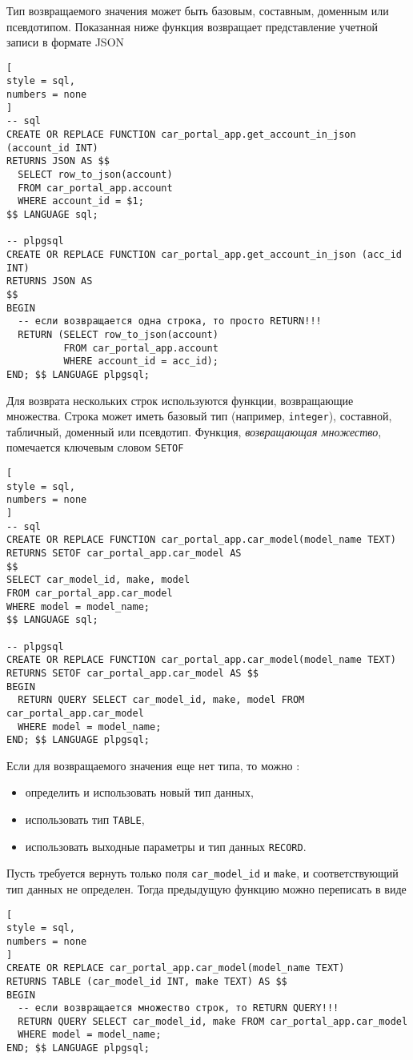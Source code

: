 \documentclass[%
	11pt,
	a4paper,
	utf8,
		]{article}
\begin{document}
Тип возвращаемого значения может быть базовым, составным, доменным или псевдотипом. Показанная ниже функция возвращает представление учетной записи в формате JSON
\begin{lstlisting}[
style = sql,
numbers = none
] 
-- sql
CREATE OR REPLACE FUNCTION car_portal_app.get_account_in_json (account_id INT)
RETURNS JSON AS $$
  SELECT row_to_json(account)
  FROM car_portal_app.account
  WHERE account_id = $1;
$$ LANGUAGE sql;

-- plpgsql
CREATE OR REPLACE FUNCTION car_portal_app.get_account_in_json (acc_id INT)
RETURNS JSON AS 
$$
BEGIN
  -- если возвращается одна строка, то просто RETURN!!!
  RETURN (SELECT row_to_json(account)
          FROM car_portal_app.account
          WHERE account_id = acc_id);
END; $$ LANGUAGE plpgsql;
\end{lstlisting}

Для возврата нескольких строк используются функции, возвращающие множества. Строка может иметь базовый тип (например, \texttt{integer}), составной, табличный, доменный или псевдотип. Функция, \emph{возвращающая множество}, помечается ключевым словом \texttt{SETOF}
\begin{lstlisting}[
style = sql,
numbers = none
]
-- sql
CREATE OR REPLACE FUNCTION car_portal_app.car_model(model_name TEXT)
RETURNS SETOF car_portal_app.car_model AS
$$
SELECT car_model_id, make, model
FROM car_portal_app.car_model
WHERE model = model_name;
$$ LANGUAGE sql;

-- plpgsql
CREATE OR REPLACE FUNCTION car_portal_app.car_model(model_name TEXT)
RETURNS SETOF car_portal_app.car_model AS $$
BEGIN
  RETURN QUERY SELECT car_model_id, make, model FROM car_portal_app.car_model
  WHERE model = model_name;
END; $$ LANGUAGE plpgsql;
\end{lstlisting}

Если для возвращаемого значения еще нет типа, то можно \cite[]{juba:2019}:
\begin{itemize}
	\item определить и использовать новый тип данных,
	
	\item использовать тип \texttt{TABLE},
	
	\item использовать выходные параметры и тип данных \texttt{RECORD}.
\end{itemize}

Пусть требуется вернуть только поля \texttt{car\_model\_id} и \texttt{make}, и соответствующий тип данных не определен. Тогда предыдущую функцию можно переписать в виде
\begin{lstlisting}[
style = sql,
numbers = none
] 
CREATE OR REPLACE car_portal_app.car_model(model_name TEXT)
RETURNS TABLE (car_model_id INT, make TEXT) AS $$
BEGIN
  -- если возвращается множество строк, то RETURN QUERY!!!
  RETURN QUERY SELECT car_model_id, make FROM car_portal_app.car_model
  WHERE model = model_name;
END; $$ LANGUAGE plpgsql;
\end{lstlisting}
\end{document}
